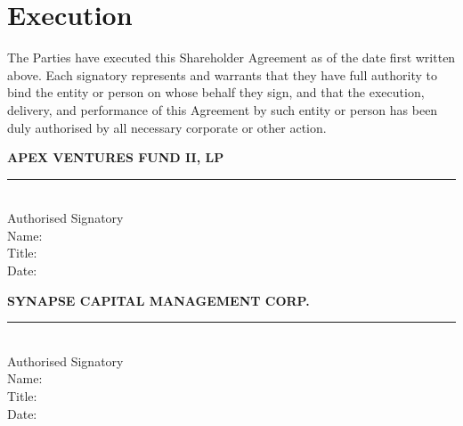 
\section*{Execution}

\begin{tcolorbox}[legalbox, title={IN WITNESS WHEREOF}]
  \noindent
  The Parties have executed this Shareholder Agreement as of the date first
  written above.  Each signatory represents and warrants that they have full
  authority to bind the entity or person on whose behalf they sign, and that the
  execution, delivery, and performance of this Agreement by such entity or person
  has been duly authorised by all necessary corporate or other action.
\end{tcolorbox}

\bigskip

\noindent
\begin{minipage}[t]{0.47\textwidth}
  \begin{tcolorbox}[notebox, top=10pt, bottom=14pt]
    \textbf{\small APEX VENTURES FUND II, LP}\\[6pt]
    \noindent\rule{\linewidth}{0.4pt}\\[2pt]
    {\small Authorised Signatory}\\[2pt]
    {\small\color{NavyMid}Name: \underline{\hspace{4.2cm}}}\\[2pt]
    {\small\color{NavyMid}Title: \underline{\hspace{4.5cm}}}\\[2pt]
    {\small\color{NavyMid}Date: \underline{\hspace{4.6cm}}}
  \end{tcolorbox}
\end{minipage}%
\hfill
\begin{minipage}[t]{0.47\textwidth}
  \begin{tcolorbox}[notebox, top=10pt, bottom=14pt]
    \textbf{\small SYNAPSE CAPITAL MANAGEMENT CORP.}\\[6pt]
    \noindent\rule{\linewidth}{0.4pt}\\[2pt]
    {\small Authorised Signatory}\\[2pt]
    {\small\color{NavyMid}Name: \underline{\hspace{4.2cm}}}\\[2pt]
    {\small\color{NavyMid}Title: \underline{\hspace{4.5cm}}}\\[2pt]
    {\small\color{NavyMid}Date: \underline{\hspace{4.6cm}}}
  \end{tcolorbox}
\end{minipage}

